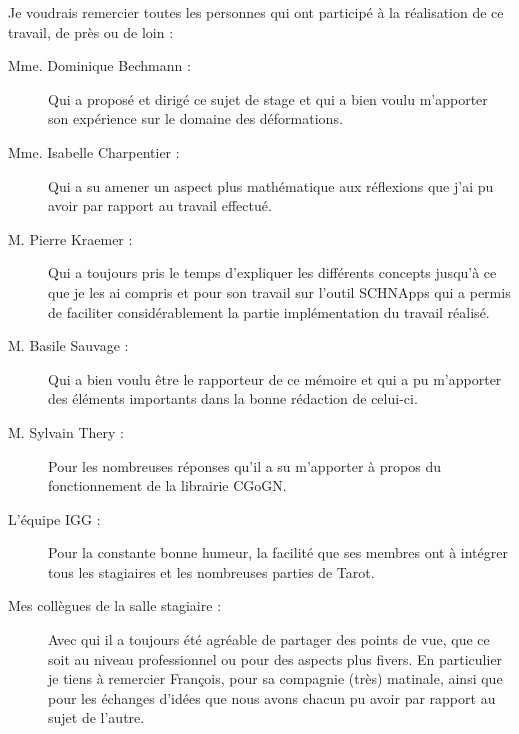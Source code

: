 


\begin{acknowledgementslong}

Je voudrais remercier toutes les personnes qui ont participé à la réalisation
de ce travail, de près ou de loin :

\begin{description} 

\item[Mme. Dominique Bechmann : ] Qui a proposé et dirigé ce sujet
de stage et qui a bien voulu m'apporter son expérience sur le domaine des
déformations.

\item[Mme. Isabelle Charpentier : ] Qui a su amener un aspect plus
mathématique aux réflexions que j'ai pu avoir par rapport au travail effectué.

\item[M. Pierre Kraemer : ] Qui a toujours pris le temps
d'expliquer les différents concepts jusqu'à ce que je les ai compris et pour
son travail sur l'outil SCHNApps qui a permis de faciliter considérablement
la partie implémentation du travail réalisé.

\item[M. Basile Sauvage : ] Qui a bien voulu être le rapporteur
de ce mémoire et qui a pu m'apporter des éléments importants dans la bonne
rédaction de celui-ci.

\item[M. Sylvain Thery : ] Pour les nombreuses réponses qu'il a
su m'apporter à propos du fonctionnement de la librairie CGoGN.

\item[L'équipe IGG : ] Pour la constante bonne humeur, la facilité
que ses membres ont à intégrer tous les stagiaires et les nombreuses parties
de Tarot.

\item[Mes collègues de la salle stagiaire : ] Avec qui il a toujours été
agréable de partager des points de vue, que ce soit au niveau professionnel ou
pour des aspects plus fivers. En particulier je tiens à remercier François,
pour sa compagnie (très) matinale, ainsi que pour les échanges d'idées que
nous avons chacun pu avoir par rapport au sujet de l'autre.

\end{description}

\end{acknowledgementslong}


